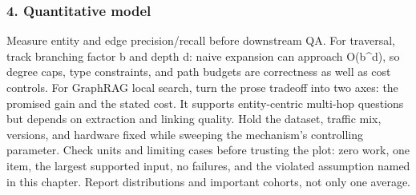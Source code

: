 \subsubsection*{4. Quantitative model}
Measure entity and edge precision/recall before downstream QA. For traversal, track branching factor b and depth d: naive expansion can approach O(b\textasciicircum{}d), so degree caps, type constraints, and path budgets are correctness as well as cost controls.
For GraphRAG local search, turn the prose tradeoff into two axes: the promised gain and the stated cost. It supports entity-centric multi-hop questions but depends on extraction and linking quality. Hold the dataset, traffic mix, versions, and hardware fixed while sweeping the mechanism's controlling parameter.
Check units and limiting cases before trusting the plot: zero work, one item, the largest supported input, no failures, and the violated assumption named in this chapter. Report distributions and important cohorts, not only one average.
